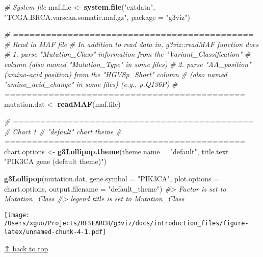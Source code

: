 \documentclass[
]{article}
\newenvironment{Shaded}{\begin{snugshade}}{\end{snugshade}}
\newcommand{\AttributeTok}[1]{\textcolor[rgb]{0.13,0.29,0.53}{#1}}
\newcommand{\CommentTok}[1]{\textcolor[rgb]{0.56,0.35,0.01}{\textit{#1}}}
\newcommand{\FunctionTok}[1]{\textcolor[rgb]{0.13,0.29,0.53}{\textbf{#1}}}
\newcommand{\NormalTok}[1]{#1}
\newcommand{\OtherTok}[1]{\textcolor[rgb]{0.56,0.35,0.01}{#1}}
\newcommand{\StringTok}[1]{\textcolor[rgb]{0.31,0.60,0.02}{#1}}
\begin{document}
\begin{Shaded}
\begin{Highlighting}[]
\CommentTok{\# System file}
\NormalTok{maf.file }\OtherTok{\textless{}{-}} \FunctionTok{system.file}\NormalTok{(}\StringTok{"extdata"}\NormalTok{, }\StringTok{"TCGA.BRCA.varscan.somatic.maf.gz"}\NormalTok{, }\AttributeTok{package =} \StringTok{"g3viz"}\NormalTok{)}

\CommentTok{\# ============================================}
\CommentTok{\# Read in MAF file}
\CommentTok{\#   In addition to read data in, g3viz::readMAF function does}
\CommentTok{\#     1. parse "Mutation\_Class" information from the "Variant\_Classification"}
\CommentTok{\#        column (also named "Mutation\_Type" in some files)}
\CommentTok{\#     2. parse "AA\_position" (amino{-}acid position) from the "HGVSp\_Short" column }
\CommentTok{\#        (also named "amino\_acid\_change" in some files) (e.g., p.Q136P)}
\CommentTok{\# ============================================}
\NormalTok{mutation.dat }\OtherTok{\textless{}{-}} \FunctionTok{readMAF}\NormalTok{(maf.file)}
\end{Highlighting}
\end{Shaded}

\begin{Shaded}
\begin{Highlighting}[]
\CommentTok{\# ============================================}
\CommentTok{\# Chart 1}
\CommentTok{\# "default" chart theme}
\CommentTok{\# ============================================}
\NormalTok{chart.options }\OtherTok{\textless{}{-}} \FunctionTok{g3Lollipop.theme}\NormalTok{(}\AttributeTok{theme.name =} \StringTok{"default"}\NormalTok{,}
                                  \AttributeTok{title.text =} \StringTok{"PIK3CA gene (default theme)"}\NormalTok{)}

\FunctionTok{g3Lollipop}\NormalTok{(mutation.dat,}
           \AttributeTok{gene.symbol =} \StringTok{"PIK3CA"}\NormalTok{,}
           \AttributeTok{plot.options =}\NormalTok{ chart.options,}
           \AttributeTok{output.filename =} \StringTok{"default\_theme"}\NormalTok{)}
\CommentTok{\#\textgreater{} Factor is set to Mutation\_Class}
\CommentTok{\#\textgreater{} legend title is set to Mutation\_Class}
\end{Highlighting}
\end{Shaded}

\texttt{[image: /Users/xguo/Projects/RESEARCH/g3viz/docs/introduction\_files/figure-latex/unnamed-chunk-4-1.pdf]}

\hyperref[top]{↥ back to top}
\end{document}
